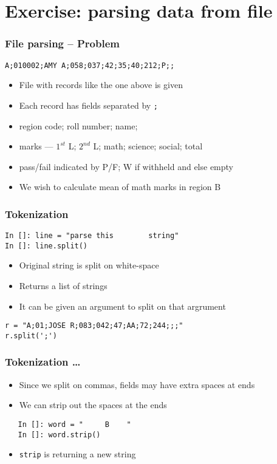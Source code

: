 \documentclass[14pt,compress]{beamer}
\begin{document}
\section{Exercise: parsing data from file}

\begin{frame}
  \frametitle{File parsing -- Problem}
  \begin{lstlisting}
A;010002;AMY A;058;037;42;35;40;212;P;;
  \end{lstlisting}
  \begin{itemize}
  \item File with records like the one above is given
  \item Each record has fields separated by \verb+;+
  \item region code; roll number; name;
  \item marks --- $1^{st}$ L; $2^{nd}$ L; math; science; social; total
  \item pass/fail indicated by P/F; W if withheld and else empty
    \end{itemize}

  \begin{itemize}
  \item We wish to calculate mean of math marks in region B
  \end{itemize}
\end{frame}

\begin{frame}[fragile]
  \frametitle{Tokenization}
  \begin{lstlisting}
In []: line = "parse this        string"
In []: line.split()
  \end{lstlisting}
  \begin{itemize}
  \item Original string is split on white-space
  \item Returns a list of strings
  \item It can be given an argument to split on that argrument
  \end{itemize}
  \begin{lstlisting}
r = "A;01;JOSE R;083;042;47;AA;72;244;;;"
r.split(';')
  \end{lstlisting}
\end{frame}

\begin{frame}[fragile]
  \frametitle{Tokenization \ldots}
  \begin{itemize}
  \item Since we split on commas, fields may have extra spaces at ends
  \item We can strip out the spaces at the ends
  \end{itemize}
  \begin{lstlisting}
   In []: word = "     B    "
   In []: word.strip()
  \end{lstlisting}
  \begin{itemize}
  \item \texttt{strip} is returning a new string
  \end{itemize}
\end{frame}
\end{document}
